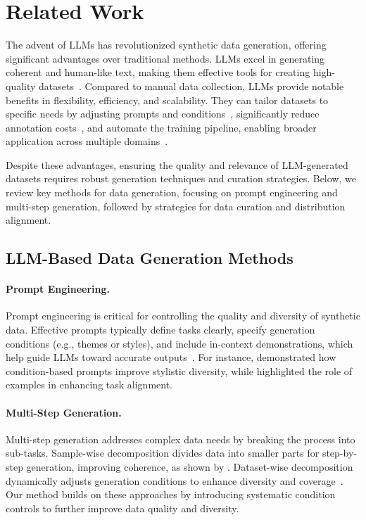 \section{Related Work}

The advent of LLMs has revolutionized synthetic data generation, offering significant advantages over traditional methods. LLMs excel in generating coherent and human-like text, making them effective tools for creating high-quality datasets~\citep{survey_llmsdrivensyntheticdata}. Compared to manual data collection, LLMs provide notable benefits in flexibility, efficiency, and scalability. They can tailor datasets to specific needs by adjusting prompts and conditions~\citep{tinystories}, significantly reduce annotation costs~\citep{self_improve}, and automate the training pipeline, enabling broader application across multiple domains~\citep{sungen}.

Despite these advantages, ensuring the quality and relevance of LLM-generated datasets requires robust generation techniques and curation strategies. Below, we review key methods for data generation, focusing on prompt engineering and multi-step generation, followed by strategies for data curation and distribution alignment.

\subsection{LLM-Based Data Generation Methods}

\paragraph{Prompt Engineering.}  
Prompt engineering is critical for controlling the quality and diversity of synthetic data. Effective prompts typically define tasks clearly, specify generation conditions (e.g., themes or styles), and include in-context demonstrations, which help guide LLMs toward accurate outputs~\citep{ChatGPTOC, best_practice}. For instance, \citet{wang2023let} demonstrated how condition-based prompts improve stylistic diversity, while \citet{li2023synthetic} highlighted the role of examples in enhancing task alignment.

\paragraph{Multi-Step Generation.}  
Multi-step generation addresses complex data needs by breaking the process into sub-tasks. Sample-wise decomposition divides data into smaller parts for step-by-step generation, improving coherence, as shown by \citet{he2023annollm}. Dataset-wise decomposition dynamically adjusts generation conditions to enhance diversity and coverage~\citep{wang2023let}. Our method builds on these approaches by introducing systematic condition controls to further improve data quality and diversity.

